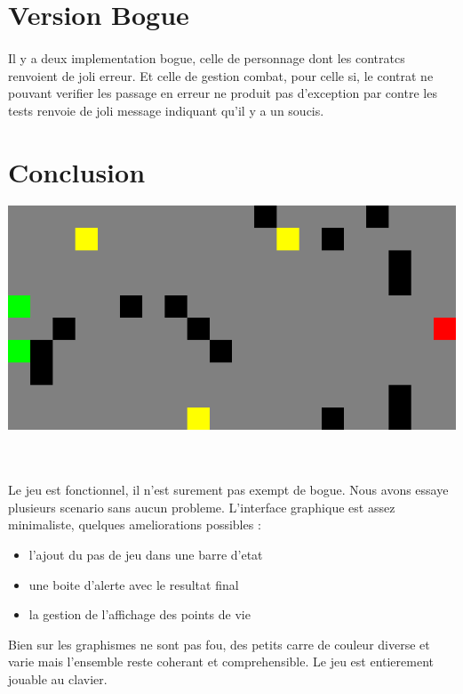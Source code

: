 \documentclass[a4paper,titlepage,openany,12pt]{report}
\begin{document}
\section*{Version Bogue}
\paragraph{}
Il y a deux implementation bogue, celle de personnage dont les
contratcs renvoient de joli erreur.
Et celle de gestion combat, pour celle si, le contrat ne pouvant
verifier les passage en erreur ne produit pas d'exception par contre
les tests renvoie de joli message indiquant qu'il y a un soucis.



\section*{Conclusion}

\includegraphics[scale=0.3]{../saved}

\\
\paragraph{}
Le jeu est fonctionnel, il n'est surement pas exempt de bogue. Nous
avons essaye plusieurs scenario sans aucun probleme. L'interface
graphique est assez minimaliste, quelques ameliorations possibles :
\begin{itemize}
\item l'ajout du pas de jeu dans une barre d'etat
\item une boite d'alerte avec le resultat final
\item la gestion de l'affichage des points de vie
\end{itemize}
Bien sur les graphismes ne sont pas fou, des petits carre de couleur
diverse et varie mais l'ensemble reste coherant et comprehensible.
Le jeu est entierement jouable au clavier.
\end{document}
